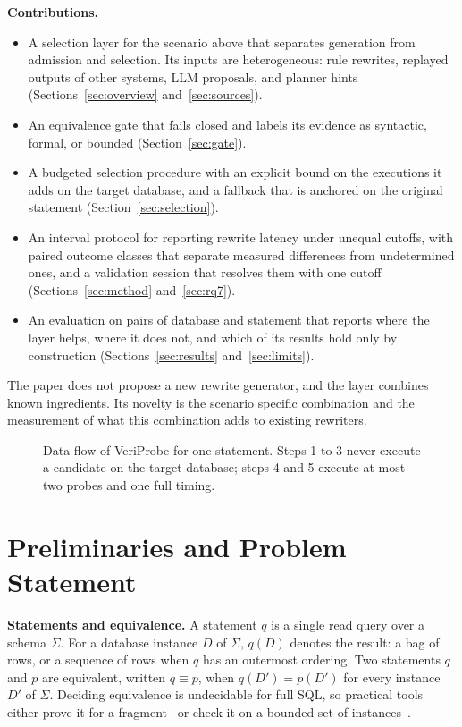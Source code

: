 \documentclass[conference]{IEEEtran}
\newcommand{\sys}{VeriProbe}
\begin{document}
\textbf{Contributions.}
\begin{itemize}
\item A selection layer for the scenario above that separates generation from admission and selection. Its inputs are heterogeneous: rule rewrites, replayed outputs of other systems, LLM proposals, and planner hints (Sections~\ref{sec:overview} and~\ref{sec:sources}).
\item An equivalence gate that fails closed and labels its evidence as syntactic, formal, or bounded (Section~\ref{sec:gate}).
\item A budgeted selection procedure with an explicit bound on the executions it adds on the target database, and a fallback that is anchored on the original statement (Section~\ref{sec:selection}).
\item An interval protocol for reporting rewrite latency under unequal cutoffs, with paired outcome classes that separate measured differences from undetermined ones, and a validation session that resolves them with one cutoff (Sections~\ref{sec:method} and~\ref{sec:rq7}).
\item An evaluation on \AllPairs{} pairs of database and statement that reports where the layer helps, where it does not, and which of its results hold only by construction (Sections~\ref{sec:results} and~\ref{sec:limits}).
\end{itemize}
The paper does not propose a new rewrite generator, and the layer combines known ingredients. Its novelty is the scenario specific combination and the measurement of what this combination adds to existing rewriters.

\begin{figure}[t]
  \centering
  
  \caption{Data flow of \sys{} for one statement. Steps 1 to 3 never execute a candidate on the target database; steps 4 and 5 execute at most two probes and one full timing.}
  \label{fig:overview}
\end{figure}

\section{Preliminaries and Problem Statement}
\label{sec:prelim}

\textbf{Statements and equivalence.}
A statement $q$ is a single read query over a schema $\Sigma$.
For a database instance $D$ of $\Sigma$, $q(D)$ denotes the result: a bag of rows, or a sequence of rows when $q$ has an outermost ordering.
Two statements $q$ and $p$ are equivalent, written $q \equiv p$, when $q(D') = p(D')$ for every instance $D'$ of $\Sigma$.
Deciding equivalence is undecidable for full SQL, so practical tools either prove it for a fragment~\cite{chu2017,zhou2019,zhou2022,ding2023,wang2024} or check it on a bounded set of instances~\cite{he2024}.
\end{document}
